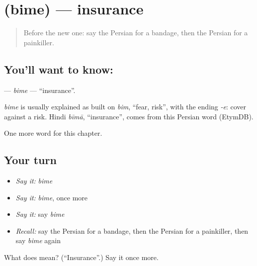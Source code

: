 \section[\texorpdfstring{\fa{بیمه} (bime)}{بیمه (bime)}]{ (bime) — insurance}

\label{lesson:FA-C227-bime}



\begin{quote}
Before the new one: say the Persian for a bandage, then the Persian for a painkiller.
\end{quote}

\subsection*{You'll want to know: }
\textbf{} — \emph{bime} — \textquotedblleft{}insurance\textquotedblright{}.

\begin{cousinweb}
\emph{bime} is usually explained as built on \emph{bim}, \textquotedblleft{}fear, risk\textquotedblright{}, with the ending \emph{-e}: cover against a risk. Hindi \emph{bīmā}, \textquotedblleft{}insurance\textquotedblright{}, comes from this Persian word (EtymDB).
\end{cousinweb}

\begin{grammarlens}[title={What you've built}]
One more word for this chapter.
\end{grammarlens}

\subsection*{Your turn}
\begin{itemize}
\raggedright
  \item \emph{Say it:} \emph{bime}
  \item \emph{Say it:} \emph{bime}, once more
  \item \emph{Say it:} say \emph{bime}
  \item \emph{Recall:} say the Persian for a bandage, then the Persian for a painkiller, then say \emph{bime} again
\end{itemize}

\begin{tcolorbox}[breakable,colback=teal!4,colframe=teal!35!black,title={Before you move on}]
What does  mean? (\textquotedblleft{}Insurance\textquotedblright{}.) Say it once more.
\end{tcolorbox}
